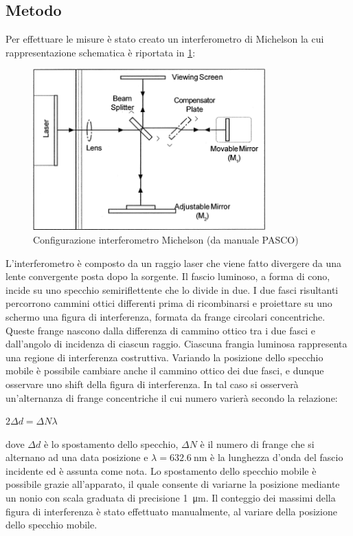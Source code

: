 \documentclass[a4paper]{article}
\begin{document}
\subsection{Metodo}
Per effettuare le misure è stato creato un interferometro di Michelson la cui rappresentazione schematica è riportata in \cref{fig:configurazione-michelson}:
\begin{figure}[htbp]
\centering
\includegraphics[width=0.8\textwidth]{./grafici/configurazione michaelson.png}
\caption{Configurazione interferometro Michelson (da manuale PASCO)}
\label{fig:configurazione-michelson}
\end{figure}
L'interferometro è composto da un raggio laser che viene fatto divergere da una lente convergente posta dopo la sorgente. Il fascio luminoso, a forma di cono, incide su uno specchio semiriflettente che lo divide in due. I due fasci risultanti percorrono cammini ottici differenti prima di ricombinarsi e proiettare su uno schermo una figura di interferenza, formata da frange circolari concentriche. Queste frange nascono dalla differenza di cammino ottico tra i due fasci e dall'angolo di incidenza di ciascun raggio. Ciascuna frangia luminosa rappresenta una regione di interferenza costruttiva. Variando la posizione dello specchio mobile è possibile cambiare anche il cammino ottico dei due fasci, e dunque osservare uno shift della figura di interferenza. In tal caso si osserverà un'alternanza di frange concentriche il cui numero varierà secondo la relazione: 
\begin{center}
    $2 \Delta d=\Delta N \lambda $
\end{center}
dove $\Delta d$ è lo spostamento dello specchio, $\Delta N$ è il numero di frange che si alternano ad una data posizione e $\lambda=\SI{632.6}{\nano\meter}$ è la lunghezza d'onda del fascio incidente ed è assunta come nota. Lo spostamento dello specchio mobile è possibile grazie all'apparato, il quale consente di variarne la posizione mediante un nonio con scala graduata di precisione \SI{1}{\micro\meter}. Il conteggio dei massimi della figura di interferenza è stato effettuato manualmente, al variare  della posizione dello specchio mobile.
\end{document}
